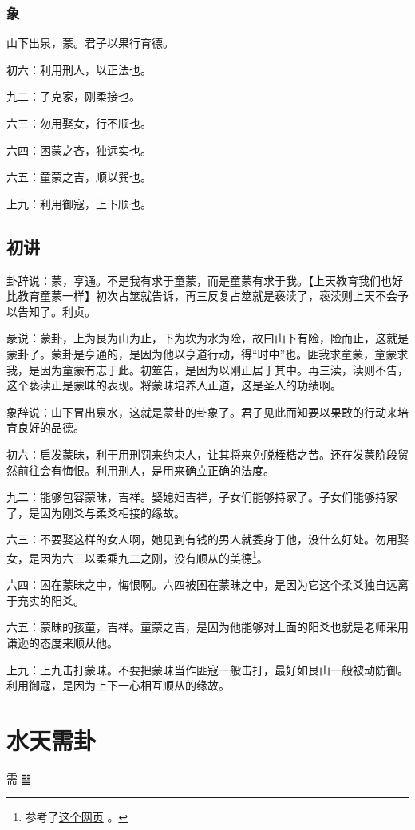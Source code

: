 \documentclass[12pt,oneside]{book}
\begin{document}
\subsection{象}
山下出泉，蒙。君子以果行育德。

初六：利用刑人，以正法也。

九二：子克家，刚柔接也。

六三：勿用娶女，行不顺也。

六四：困蒙之吝，独远实也。

六五：童蒙之吉，顺以巽也。

上九：利用御寇，上下顺也。

\section{初讲}
卦辞说：蒙，亨通。不是我有求于童蒙，而是童蒙有求于我。【上天教育我们也好比教育童蒙一样】初次占筮就告诉，再三反复占筮就是亵渎了，亵渎则上天不会予以告知了。利贞。

彖说：蒙卦，上为艮为山为止，下为坎为水为险，故曰山下有险，险而止，这就是蒙卦了。蒙卦是亨通的，是因为他以亨道行动，得“时中”也。匪我求童蒙，童蒙求我，是因为童蒙有志于此。初筮告，是因为以刚正居于其中。再三渎，渎则不告，这个亵渎正是蒙昧的表现。将蒙昧培养入正道，这是圣人的功绩啊。

象辞说：山下冒出泉水，这就是蒙卦的卦象了。君子见此而知要以果敢的行动来培育良好的品德。

初六：启发蒙昧，利于用刑罚来约束人，让其将来免脱桎梏之苦。还在发蒙阶段贸然前往会有悔恨。利用刑人，是用来确立正确的法度。

九二：能够包容蒙昧，吉祥。娶媳妇吉祥，子女们能够持家了。子女们能够持家了，是因为刚爻与柔爻相接的缘故。

六三：不要娶这样的女人啊，她见到有钱的男人就委身于他，没什么好处。勿用娶女，是因为六三以柔乘九二之刚，没有顺从的美德\footnote{参考了\href{http://www.guoxuez.com/64gua/menggua/23431.html}{这个网页} 。}。

六四：困在蒙昧之中，悔恨啊。六四被困在蒙昧之中，是因为它这个柔爻独自远离于充实的阳爻。

六五：蒙昧的孩童，吉祥。童蒙之吉，是因为他能够对上面的阳爻也就是老师采用谦逊的态度来顺从他。

上九：上九击打蒙昧。不要把蒙昧当作匪寇一般击打，最好如艮山一般被动防御。利用御寇，是因为上下一心相互顺从的缘故。




\chapter{水天需卦}
需 {\Large ䷄}
\end{document}
